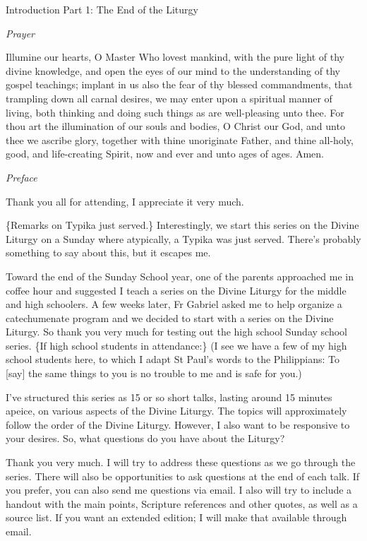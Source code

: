 \documentclass[
]{article}
\author{}
\date{}
\begin{document}
Introduction Part 1: The End of the Liturgy

\emph{Prayer}

Illumine our hearts, O Master Who lovest mankind, with the pure light of
thy divine knowledge, and open the eyes of our mind to the understanding
of thy gospel teachings; implant in us also the fear of thy blessed
commandments, that trampling down all carnal desires, we may enter upon
a spiritual manner of living, both thinking and doing such things as are
well-pleasing unto thee. For thou art the illumination of our souls and
bodies, O Christ our God, and unto thee we ascribe glory, together with
thine unoriginate Father, and thine all-holy, good, and life-creating
Spirit, now and ever and unto ages of ages. Amen.

\emph{Preface}

Thank you all for attending, I appreciate it very much.

\{Remarks on Typika just served.\} Interestingly, we start this series
on the Divine Liturgy on a Sunday where atypically, a Typika was just
served. There's probably something to say about this, but it escapes me.

Toward the end of the Sunday School year, one of the parents approached
me in coffee hour and suggested I teach a series on the Divine Liturgy
for the middle and high schoolers. A few weeks later, Fr Gabriel asked
me to help organize a catechumenate program and we decided to start with
a series on the Divine Liturgy. So thank you very much for testing out
the high school Sunday school series. \{If high school students in
attendance:\} (I see we have a few of my high school students here, to
which I adapt St Paul's words to the Philippians: To {[}say{]} the same
things to you is no trouble to me and is safe for you.)

I've structured this series as 15 or so short talks, lasting around 15
minutes apeice, on various aspects of the Divine Liturgy. The topics
will approximately follow the order of the Divine Liturgy. However, I
also want to be responsive to your desires. So, what questions do you
have about the Liturgy?

Thank you very much. I will try to address these questions as we go
through the series. There will also be opportunities to ask questions at
the end of each talk. If you prefer, you can also send me questions via
email. I also will try to include a handout with the main points,
Scripture references and other quotes, as well as a source list. If you
want an extended edition; I will make that available through email.
\end{document}
